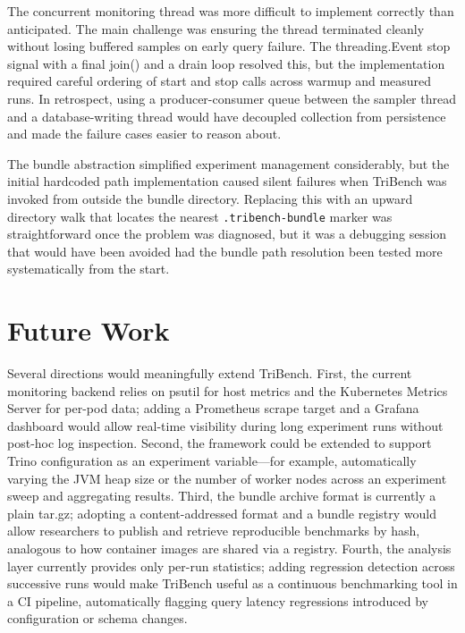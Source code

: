 \documentclass{l4proj}
\begin{document}
The concurrent monitoring thread was more difficult to implement correctly than anticipated. The main challenge was ensuring the thread terminated cleanly without losing buffered samples on early query failure. The threading.Event stop signal with a final join() and a drain loop resolved this, but the implementation required careful ordering of start and stop calls across warmup and measured runs. In retrospect, using a producer-consumer queue between the sampler thread and a database-writing thread would have decoupled collection from persistence and made the failure cases easier to reason about.

The bundle abstraction simplified experiment management considerably, but the initial hardcoded path implementation caused silent failures when TriBench was invoked from outside the bundle directory. Replacing this with an upward directory walk that locates the nearest \texttt{.tribench-bundle} marker was straightforward once the problem was diagnosed, but it was a debugging session that would have been avoided had the bundle path resolution been tested more systematically from the start.

\section{Future Work}
\label{sec:future_work}

Several directions would meaningfully extend TriBench. First, the current monitoring backend relies on psutil for host metrics and the Kubernetes Metrics Server for per-pod data; adding a Prometheus scrape target and a Grafana dashboard would allow real-time visibility during long experiment runs without post-hoc log inspection. Second, the framework could be extended to support Trino configuration as an experiment variable---for example, automatically varying the JVM heap size or the number of worker nodes across an experiment sweep and aggregating results. Third, the bundle archive format is currently a plain tar.gz; adopting a content-addressed format and a bundle registry would allow researchers to publish and retrieve reproducible benchmarks by hash, analogous to how container images are shared via a registry. Fourth, the analysis layer currently provides only per-run statistics; adding regression detection across successive runs would make TriBench useful as a continuous benchmarking tool in a CI pipeline, automatically flagging query latency regressions introduced by configuration or schema changes.

%
% 
\end{document}
